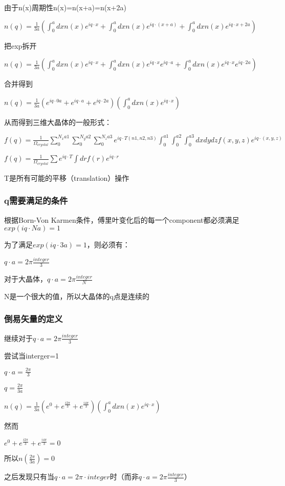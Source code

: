 \documentclass{article}
\begin{document}
由于n(x)周期性n(x)=n(x+a)=n(x+2a)

$n(q)=\frac{1}{3a}(\int_0^adxn(x)e^{iq·x} +\int_0^{a}dxn(x)e^{iq·(x+a)}+\int_{0}^{a}dxn(x)e^{iq·x+2a})$

把exp拆开

$n(q)=\frac{1}{3a}(\int_0^adxn(x)e^{iq·x} +\int_0^{a}dxn(x)e^{iq·x}e^{iq·a}+\int_{0}^{a}dxn(x)e^{iq·x}e^{iq·2a})$

合并得到

$n(q)=\frac{1}{3a}(e^{iq·0a}+e^{iq·a}+e^{iq·2a})(\int_0^adxn(x)e^{iq·x})$

从而得到三维大晶体的一般形式：

$f(q)=\frac{1}{\Omega_{crystal}}\sum_0^{N_xa1}\sum_0^{N_ya2} \sum_0^{N_za3}  e^{iq·T(n1,n2,n3)} \int_0^{a1} \int_0^{a2} \int_0^{a3} dxdydzf(x,y,z) e^{iq·(x,y,z)}$

$f(q)=\frac{1}{\Omega_{crystal}}\sum e^{iq·T} \int drf(r) e^{iq·r}$

T是所有可能的平移（translation）操作

\subsubsection {q需要满足的条件}

根据Born-Von Karmen条件，傅里叶变化后的每一个component都必须满足 $exp(i q·Na)=1$

为了满足$exp(iq·3a) =1$，则必须有：

$q·a=2\pi \frac{integer}{3}$

对于大晶体，$q·a=2\pi \frac{integer}{N}$

N是一个很大的值，所以大晶体的q点是连续的

\subsubsection {倒易矢量的定义}

继续对于$q·a=2\pi \frac{integer}{3}$

尝试当interger=1

$q·a=\frac{2\pi}{3}$

$q=\frac{2\pi}{3a}$

$n(q)=\frac{1}{3a}(e^{0}+e^{\frac{i2\pi}{3}}+e^{\frac{i4\pi}{3}})(\int_0^adxn(x)e^{iq·x})$

然而

$e^{0}+e^{\frac{i2\pi}{3}}+e^{\frac{i4\pi}{3}}=0$

所以$n(\frac{2\pi}{3a})=0$

之后发现只有当$q·a=2\pi · integer$时（而非$q·a=2\pi \frac{integer}{3}$）
\end{document}
